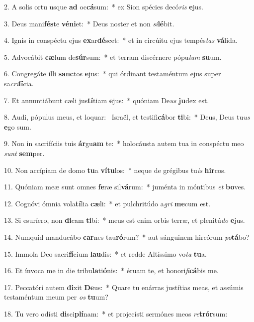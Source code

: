 2. A solis ortu usque \textbf{ad} oc\textbf{cá}sum:~*  ex Sion spécies decó\textit{ris} \textbf{e}jus.\

3. Deus mani\textbf{fés}te \textbf{vé}\textbf{ni}et:~*  Deus noster et non \textit{si}\textbf{lé}bit.\

4. Ignis in conspéctu ejus \textbf{ex}ar\textbf{dé}scet:~*  et in circúitu ejus tempés\textit{tas} \textbf{vá}lida.\

5. Advocábit \textbf{cæ}lum de\textbf{súr}sum:~*  et terram discérnere pópu\textit{lum} \textbf{su}um.\

6. Congregáte illi \textbf{sanc}tos \textbf{e}jus:~*  qui órdinant testaméntum ejus super sa\textit{cri}\textbf{fí}cia.\

7. Et annuntiábunt cæli jus\textbf{tí}tiam \textbf{e}jus:~*  quóniam De\textit{us} \textbf{ju}dex est.\

8. Audi, pópulus meus, et loquar: \dag\  Israël, et testifi\textbf{cá}bor \textbf{ti}bi:~*  Deus, Deus tu\textit{us} \textbf{e}go sum.\

9. Non in sacrifíciis tuis \textbf{ár}gu\textbf{am} te:~*  holocáusta autem tua in conspéctu meo \textit{sunt} \textbf{sem}per.\

10. Non accípiam de domo \textbf{tu}a \textbf{ví}\textbf{tu}los:~*  neque de grégibus tu\textit{is} \textbf{hir}cos.\

11. Quóniam meæ sunt omnes \textbf{fe}ræ sil\textbf{vá}rum:~*  juménta in móntibus \textit{et} \textbf{bo}ves.\

12. Cognóvi ómnia vola\textbf{tí}lia \textbf{cæ}li:~*  et pulchritúdo a\textit{gri} \textbf{me}cum est.\

13. Si esuríero, non \textbf{di}cam \textbf{ti}bi:~*  meus est enim orbis terræ, et plenitú\textit{do} \textbf{e}jus.\

14. Numquid manducábo \textbf{car}nes tau\textbf{ró}rum?~*  aut sánguinem hircórum \textit{po}\textbf{tá}bo?\

15. Immola Deo sacri\textbf{fí}cium \textbf{lau}dis:~*  et redde Altíssimo vo\textit{ta} \textbf{tu}a.\

16. Et ínvoca me in die tribu\textbf{la}ti\textbf{ó}nis:~*  éruam te, et honori\textit{fi}\textbf{cá}bis me.\

17. Peccatóri autem \textbf{di}xit \textbf{De}us:~*  Quare tu enárras justítias meas, et assúmis testaméntum meum per \textit{os} \textbf{tu}um?\

18. Tu vero odísti \textbf{di}sci\textbf{plí}nam:~*  et projecísti sermónes meos \textit{re}\textbf{trór}sum:\

